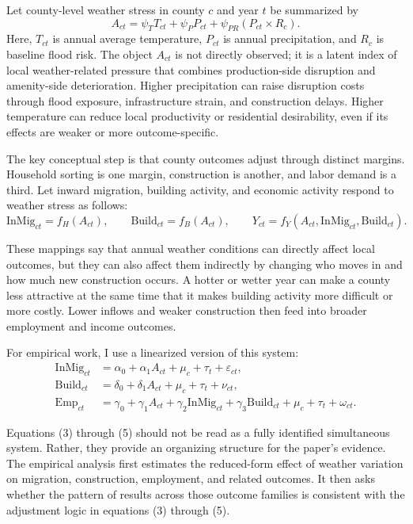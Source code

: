 \documentclass[12pt]{article}
\begin{document}
Let county-level weather stress in county $c$ and year $t$ be summarized by
\begin{equation}
A_{ct} = \psi_T T_{ct} + \psi_P P_{ct} + \psi_{PR}\left(P_{ct}\times R_c\right).
\end{equation}
Here, $T_{ct}$ is annual average temperature, $P_{ct}$ is annual precipitation, and $R_c$ is baseline flood risk. The object $A_{ct}$ is not directly observed; it is a latent index of local weather-related pressure that combines production-side disruption and amenity-side deterioration. Higher precipitation can raise disruption costs through flood exposure, infrastructure strain, and construction delays. Higher temperature can reduce local productivity or residential desirability, even if its effects are weaker or more outcome-specific.

The key conceptual step is that county outcomes adjust through distinct margins. Household sorting is one margin, construction is another, and labor demand is a third. Let inward migration, building activity, and economic activity respond to weather stress as follows:
\begin{equation}
\text{InMig}_{ct} = f_H(A_{ct}), \qquad \text{Build}_{ct} = f_B(A_{ct}), \qquad Y_{ct} = f_Y\!\left(A_{ct}, \text{InMig}_{ct}, \text{Build}_{ct}\right).
\end{equation}

These mappings say that annual weather conditions can directly affect local outcomes, but they can also affect them indirectly by changing who moves in and how much new construction occurs. A hotter or wetter year can make a county less attractive at the same time that it makes building activity more difficult or more costly. Lower inflows and weaker construction then feed into broader employment and income outcomes.

For empirical work, I use a linearized version of this system:
\begin{align}
\text{InMig}_{ct} &= \alpha_0 + \alpha_1 A_{ct} + \mu_c + \tau_t + \varepsilon_{ct}, \\
\text{Build}_{ct} &= \delta_0 + \delta_1 A_{ct} + \mu_c + \tau_t + \nu_{ct}, \\
\text{Emp}_{ct} &= \gamma_0 + \gamma_1 A_{ct} + \gamma_2 \text{InMig}_{ct} + \gamma_3 \text{Build}_{ct} + \mu_c + \tau_t + \omega_{ct}.
\end{align}

Equations (3) through (5) should not be read as a fully identified simultaneous system. Rather, they provide an organizing structure for the paper's evidence. The empirical analysis first estimates the reduced-form effect of weather variation on migration, construction, employment, and related outcomes. It then asks whether the pattern of results across those outcome families is consistent with the adjustment logic in equations (3) through (5).
\end{document}
